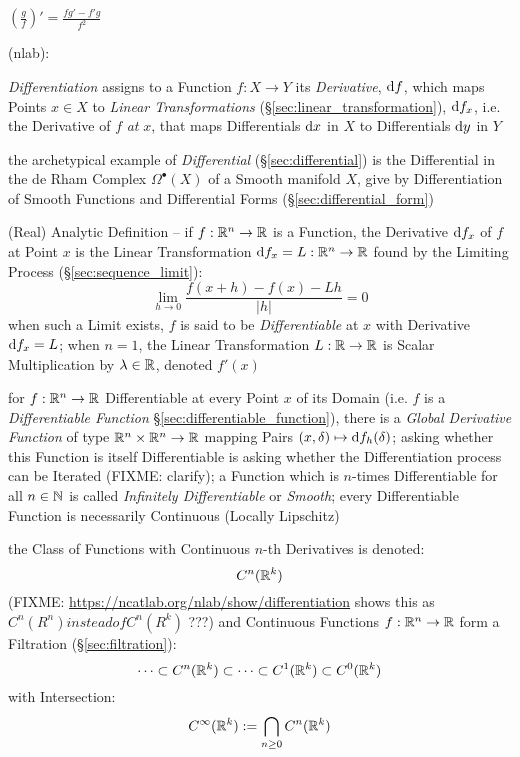 $(\frac{g}{f})' = \frac{f g' - f' g}{f^2}$

\asterism

(nlab):

\emph{Differentiation} assigns to a Function $f : X \rightarrow Y$ its
\emph{Derivative}, $\mathrm{d}f$, which maps Points $x \in X$ to \emph{Linear
  Transformations} (\S\ref{sec:linear_transformation}), $\mathrm{d}f_x$, i.e. the
Derivative of $f$ \emph{at} $x$, that maps Differentials $\mathrm{d}x$ in $X$ to
Differentials $\mathrm{d}y$ in $Y$

\fist the archetypical example of \emph{Differential} (\S\ref{sec:differential})
is the Differential in the de Rham Complex $\Omega^\bullet(X)$ of a Smooth
manifold $X$, give by Differentiation of Smooth Functions and Differential Forms
(\S\ref{sec:differential_form})

(Real) Analytic Definition -- if $f : \mathbb{R}^n \rightarrow \mathbb{R}$ is a
Function, the Derivative $\mathrm{d}f_x$ of $f$ at Point $x$ is the Linear
Transformation $\mathrm{d}f_x = L : \mathbb{R}^n \rightarrow \mathbb{R}$ found by the
Limiting Process (\S\ref{sec:sequence_limit}):
\[
  \lim_{h\rightarrow{0}} \frac{f(x + h) - f(x) - Lh}{|h|} = 0
\]
when such a Limit exists, $f$ is said to be \emph{Differentiable} at $x$ with
Derivative $\mathrm{d}f_x = L$; when $n=1$, the Linear Transformation $L : \mathbb{R}
\rightarrow \mathbb{R}$ is Scalar Multiplication by $\lambda \in \mathbb{R}$, denoted
$f'(x)$

for $f : \mathbb{R}^n \rightarrow \mathbb{R}$ Differentiable at every Point $x$ of its
Domain (i.e. $f$ is a \emph{Differentiable Function}
\S\ref{sec:differentiable_function}), there is a \emph{Global Derivative
  Function} of type $\mathbb{R}^n \times \mathbb{R}^n \rightarrow \mathbb{R}$ mapping Pairs
$(x,\delta) \mapsto \mathrm{d}f_h(\delta)$; asking whether this Function is itself
Differentiable is asking whether the Differentiation process can be Iterated
(FIXME: clarify); a Function which is $n$-times Differentiable for all $n \in
\mathbb{N}$ is called \emph{Infinitely Differentiable} or \emph{Smooth}; every
Differentiable Function is necessarily Continuous (Locally Lipschitz)

the Class of Functions with Continuous $n$-th Derivatives is denoted:
\[
  C^n(\mathbb{R}^k)
\]
(FIXME: \url{https://ncatlab.org/nlab/show/differentiation} shows this as
$C^n(R^n) instead of C^n(R^k)$ ???)
and Continuous Functions $f : \mathbb{R}^n \rightarrow \mathbb{R}$ form a Filtration
(\S\ref{sec:filtration}):
\[
  \cdots \subset C^n(\mathbb{R}^k) \subset \cdots \subset C^1(\mathbb{R}^k) \subset
    C^0(\mathbb{R}^k)
\]
with Intersection:
\[
  C^\infty(\mathbb{R}^k) := \bigcap_{n\geq{0}} C^n(\mathbb{R}^k)
\]

